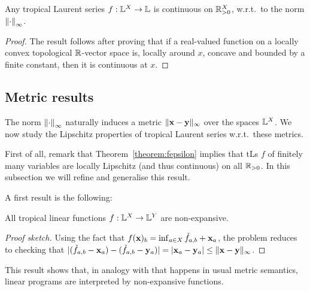 \begin{theorem}\label{thm:cont}
 Any tropical Laurent series $f:\mathbb{L}^X\to\mathbb{L}$ is continuous on $\mathbb{R}_{>0}^X$, w.r.t.\ to the norm $\left\lVert\cdot\right\rVert_\infty$.
\end{theorem}
\begin{proof}
 The result follows after proving that if a real-valued function on a locally convex topological $\mathbb{R}$-vector space is, locally around $x$, concave and bounded by a finite constant, then it is continuous at $x$.
\end{proof}


\subsection{Metric results}%


The norm $\left\lVert\cdot\right\rVert_\infty$ naturally induces a metric $\|\mathbf{x}-\mathbf{y}\|_{\infty}$ over the spaces $\mathbb{L}^{X}$. 
We now study the Lipschitz properties of tropical Laurent series w.r.t.~these metrics. 

First of all, remark that Theorem~\ref{theorem:fepsilon} implies that tLs $f$ of finitely many variables are locally Lipschitz (and thus continuous) on all $\mathbb{R}_{>0}$.
In this subsection we will refine and generalise this result.

A first result is the following:

\begin{proposition}\label{prop:troplinear}
All tropical linear functions $f: \mathbb{L}^{X}\to \mathbb{L}^{Y}$ are non-expansive.  
\end{proposition}
\begin{proof}[Proof sketch]
Using the fact that $f(\mathbf{x})_{b}= \inf_{a\in X}\check f_{a,b}+\mathbf{x}_{a}$,
the problem reduces to checking that $|(\check f_{a,b}-\mathbf{x}_{a})- (\check f_{a,b}-\mathbf{y}_{a})| = |\mathbf{x}_{a}-\mathbf{y}_{a}|\leq \| \mathbf{x}-\mathbf{y}\|_{\infty}$.\end{proof}
This result shows that, in analogy with that happens in usual metric semantics, linear programs are interpreted by non-expansive functions. 

